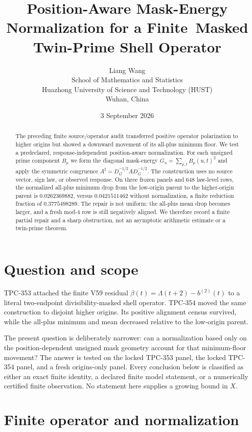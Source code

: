 \documentclass[10pt]{article}
\title{Position-Aware Mask-Energy Normalization for a Finite\
Masked Twin-Prime Shell Operator}
\author{Liang Wang\\
School of Mathematics and Statistics\\
Huazhong University of Science and Technology (HUST)\\
Wuhan, China}
\date{3 September 2026}
\begin{document}
\maketitle

\begin{abstract}
The preceding finite source/operator audit transferred positive operator
polarization to higher origins but showed a downward movement of its all-plus
minimum floor.  We test a predeclared, response-independent position-aware
normalization.  For each unsigned prime component $B_p$ we form the diagonal
mask-energy $G_u=\sum_{p,t}B_p(u,t)^2$ and apply the symmetric congruence
$A^\sharp=D_G^{-1/2}AD_G^{-1/2}$.  The construction uses no source vector,
sign law, or observed response.  On three frozen panels and 648 law-level
rows, the normalized all-plus minimum drop from the low-origin parent to the
higher-origin parent is $0.0262369882$, versus $0.0421511462$ without
normalization, a finite reduction fraction of $0.3775498289$.  The repair is
not uniform: the all-plus mean drop becomes larger, and a fresh mod-4 row is
still negatively aligned.  We therefore record a finite partial repair and a
sharp obstruction, not an asymptotic arithmetic estimate or a twin-prime
theorem.
\end{abstract}

\section{Question and scope}

TPC-353 attached the finite V59 residual
$\beta(t)=\Lambda(t+2)-b^{(2)}(t)$ to a literal two-endpoint
divisibility-masked shell operator.  TPC-354 moved the same construction to
disjoint higher origins.  Its positive alignment census survived, while the
all-plus minimum and mean decreased relative to the low-origin parent.

The present question is deliberately narrower: can a normalization based only
on the position-dependent unsigned mask geometry account for that minimum-floor
movement?  The answer is tested on the locked TPC-353 panel, the locked
TPC-354 panel, and a fresh origins-only panel.  Every conclusion below is
classified as either an exact finite identity, a declared finite model
statement, or a numerically certified finite observation.  No statement here
supplies a growing bound in $X$.

\section{Finite operator and normalization}
\end{document}
